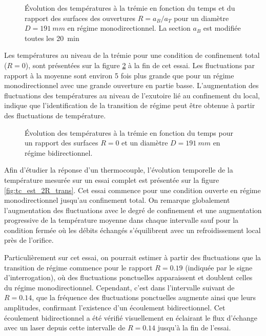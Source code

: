 \begin{figure}
\centering
\resizebox{0.69\textwidth}{!}{}
\caption{Évolution des températures à la trémie en fonction du temps et du rapport des surfaces des ouvertures $R=a_B/a_T$ pour un diamètre $D=\SI{191}{mm}$ en régime monodirectionnel. La section $a_B$ est modifiée toutes les \SI{20}{min}}
\label{fig:tc_mono_D191_2R}
\end{figure}

Les températures au niveau de la trémie pour une condition de confinement total ($R=0$), sont présentées sur la figure \ref{fig:tc_bidi_D191_2R} à la fin de cet essai. Les fluctuations par rapport à la moyenne sont environ 5 fois plus grande que pour un régime monodirectionnel avec une grande ouverture en partie basse. L'augmentation des fluctuations des températures au niveau de l'exutoire lié au confinement du local, indique que l'identification de la transition de régime peut être obtenue à partir des fluctuations de température.

\begin{figure}
\centering
\resizebox{0.69\textwidth}{!}{}
\caption{Évolution des températures à la trémie en fonction du temps pour un rapport des surfaces $R=0$ et un diamètre $D=\SI{191}{mm}$ en régime bidirectionnel.}
\label{fig:tc_bidi_D191_2R}
\end{figure}

Afin d'étudier la réponse d'un thermocouple, l'évolution temporelle de la température mesurée sur un essai complet est présentée sur la figure \ref{fig:tc_est_2R_trans}. Cet essai commence pour une condition ouverte en régime monodirectionnel jusqu'au confinement total. On remarque globalement l'augmentation des fluctuations avec le degré de confinement et une augmentation progressive de la température moyenne dans chaque intervalle sauf pour la condition fermée où les débits échangés s'équilibrent avec un refroidissement local près de l'orifice.

Particulièrement sur cet essai, on pourrait estimer à partir des fluctuations que la transition de régime commence pour le rapport $R=0.19$ (indiquée par le signe d'interrogation), où des fluctuations ponctuelles apparaissent et doublent celles du régime monodirectionnel. Cependant, c'est dans l'intervalle suivant de $R=0.14$, que la fréquence des fluctuations ponctuelles augmente ainsi que leurs amplitudes, confirmant l'existence d'un écoulement bidirectionnel. Cet écoulement bidirectionnel a été vérifié visuellement en éclairant le flux d'échange avec un laser depuis cette intervalle de $R=0.14$ jusqu'à la fin de l'essai. 

